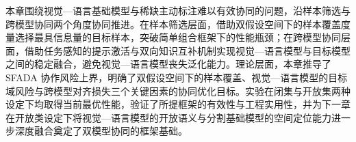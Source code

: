 本章围绕视觉—语言基础模型与稀缺主动标注难以有效协同的问题，沿样本筛选与跨模型协同两个角度协同推进。在样本筛选层面，借助双假设空间下的样本覆盖度量选择最具信息量的目标样本，突破简单组合框架下的性能瓶颈；在跨模型协同层面，借助任务感知的提示激活与双向知识互补机制实现视觉—语言模型与目标模型之间的稳定融合，避免视觉—语言模型丧失泛化能力。理论层面，本章推导了 SFADA 协作风险上界，明确了双假设空间下的样本覆盖、视觉—语言模型的目标域风险与跨模型对齐损失三个关键因素的协同优化目标。实验在闭集与开放集两种设定下均取得当前最优性能，验证了所提框架的有效性与工程实用性，并为下一章在开放类设定下将视觉—语言模型的开放语义与分割基础模型的空间定位能力进一步深度融合奠定了双模型协同的框架基础。

